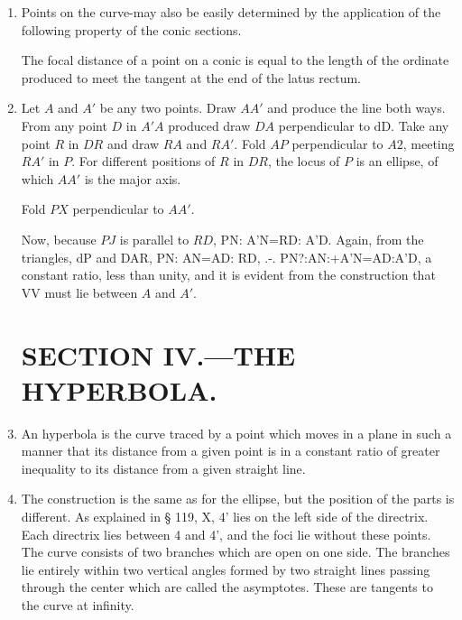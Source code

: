 \begin{enumerate}

\item Points on the curve-may also be easily determined by the application of
    the following property of the conic sections.

    The focal distance of a point on a conic is equal to the length of the
    ordinate produced to meet the tangent at the end of the latus rectum.

\item Let $A$ and $A'$ be any two points. Draw $AA'$ and produce the line both
    ways.  From any point $D$ in $A'A$ produced draw $DA$ perpendicular to dD.
    Take any point $R$ in $DR$ and draw $RA$ and $RA'$.  Fold $AP$ perpendicular
    to $A2$, meeting $RA'$ in $P$.  For different positions of $R$ in $DR$, the
    locus of $P$ is an ellipse, of which $AA'$ is the major axis.


    Fold $PX$ perpendicular to $AA'$.

    Now, because $PJ$ is parallel to $RD$, PN: A'N=RD: A'D.  Again, from the
    triangles, dP and DAR, PN: AN=AD: RD, .-. PN?:AN:+A'N=AD:A'D, a constant
    ratio, less than unity, and it is evident from the construction that VV must
    lie between $A$ and $A'$.





\section{SECTION IV.—THE HYPERBOLA.}


\item An hyperbola is the curve traced by a point which moves in a plane in such
    a manner that its distance from a given point is in a constant ratio of
    greater inequality to its distance from a given straight line.

\item The construction is the same as for the ellipse, but the position of the
    parts is different. As explained in § 119, X, 4’ lies on the left side of
    the directrix. Each directrix lies between 4 and 4’, and the foci lie
    without these points. The curve consists of two branches which are open on
    one side.  The branches lie entirely within two vertical angles formed by
    two straight lines passing through the center which are called the
    asymptotes. These are tangents to the curve at infinity.



\end{enumerate}
